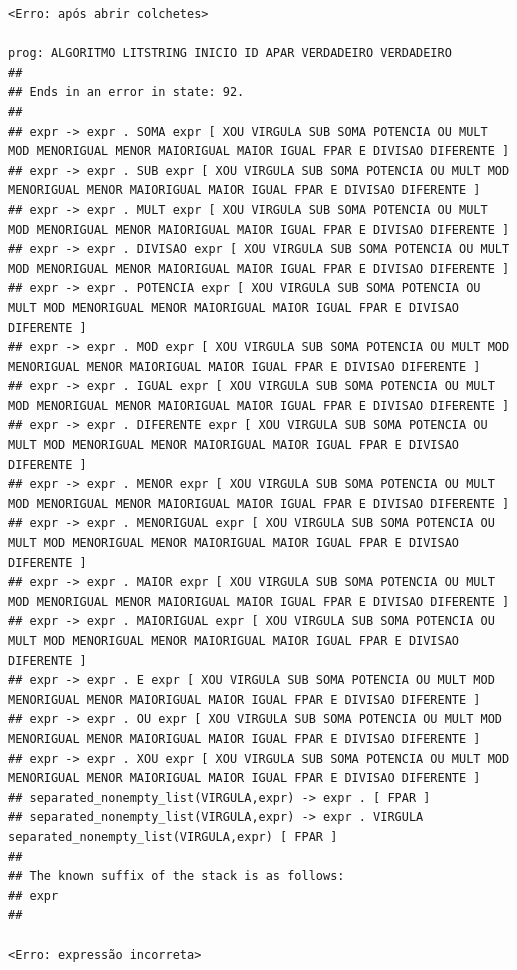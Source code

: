 \documentclass[hidelinks,12pt]{article}
\begin{document}
\begin{lstlisting}
<Erro: após abrir colchetes>

prog: ALGORITMO LITSTRING INICIO ID APAR VERDADEIRO VERDADEIRO 
##
## Ends in an error in state: 92.
##
## expr -> expr . SOMA expr [ XOU VIRGULA SUB SOMA POTENCIA OU MULT MOD MENORIGUAL MENOR MAIORIGUAL MAIOR IGUAL FPAR E DIVISAO DIFERENTE ]
## expr -> expr . SUB expr [ XOU VIRGULA SUB SOMA POTENCIA OU MULT MOD MENORIGUAL MENOR MAIORIGUAL MAIOR IGUAL FPAR E DIVISAO DIFERENTE ]
## expr -> expr . MULT expr [ XOU VIRGULA SUB SOMA POTENCIA OU MULT MOD MENORIGUAL MENOR MAIORIGUAL MAIOR IGUAL FPAR E DIVISAO DIFERENTE ]
## expr -> expr . DIVISAO expr [ XOU VIRGULA SUB SOMA POTENCIA OU MULT MOD MENORIGUAL MENOR MAIORIGUAL MAIOR IGUAL FPAR E DIVISAO DIFERENTE ]
## expr -> expr . POTENCIA expr [ XOU VIRGULA SUB SOMA POTENCIA OU MULT MOD MENORIGUAL MENOR MAIORIGUAL MAIOR IGUAL FPAR E DIVISAO DIFERENTE ]
## expr -> expr . MOD expr [ XOU VIRGULA SUB SOMA POTENCIA OU MULT MOD MENORIGUAL MENOR MAIORIGUAL MAIOR IGUAL FPAR E DIVISAO DIFERENTE ]
## expr -> expr . IGUAL expr [ XOU VIRGULA SUB SOMA POTENCIA OU MULT MOD MENORIGUAL MENOR MAIORIGUAL MAIOR IGUAL FPAR E DIVISAO DIFERENTE ]
## expr -> expr . DIFERENTE expr [ XOU VIRGULA SUB SOMA POTENCIA OU MULT MOD MENORIGUAL MENOR MAIORIGUAL MAIOR IGUAL FPAR E DIVISAO DIFERENTE ]
## expr -> expr . MENOR expr [ XOU VIRGULA SUB SOMA POTENCIA OU MULT MOD MENORIGUAL MENOR MAIORIGUAL MAIOR IGUAL FPAR E DIVISAO DIFERENTE ]
## expr -> expr . MENORIGUAL expr [ XOU VIRGULA SUB SOMA POTENCIA OU MULT MOD MENORIGUAL MENOR MAIORIGUAL MAIOR IGUAL FPAR E DIVISAO DIFERENTE ]
## expr -> expr . MAIOR expr [ XOU VIRGULA SUB SOMA POTENCIA OU MULT MOD MENORIGUAL MENOR MAIORIGUAL MAIOR IGUAL FPAR E DIVISAO DIFERENTE ]
## expr -> expr . MAIORIGUAL expr [ XOU VIRGULA SUB SOMA POTENCIA OU MULT MOD MENORIGUAL MENOR MAIORIGUAL MAIOR IGUAL FPAR E DIVISAO DIFERENTE ]
## expr -> expr . E expr [ XOU VIRGULA SUB SOMA POTENCIA OU MULT MOD MENORIGUAL MENOR MAIORIGUAL MAIOR IGUAL FPAR E DIVISAO DIFERENTE ]
## expr -> expr . OU expr [ XOU VIRGULA SUB SOMA POTENCIA OU MULT MOD MENORIGUAL MENOR MAIORIGUAL MAIOR IGUAL FPAR E DIVISAO DIFERENTE ]
## expr -> expr . XOU expr [ XOU VIRGULA SUB SOMA POTENCIA OU MULT MOD MENORIGUAL MENOR MAIORIGUAL MAIOR IGUAL FPAR E DIVISAO DIFERENTE ]
## separated_nonempty_list(VIRGULA,expr) -> expr . [ FPAR ]
## separated_nonempty_list(VIRGULA,expr) -> expr . VIRGULA separated_nonempty_list(VIRGULA,expr) [ FPAR ]
##
## The known suffix of the stack is as follows:
## expr 
##

<Erro: expressão incorreta>


\end{lstlisting}
\end{document}
